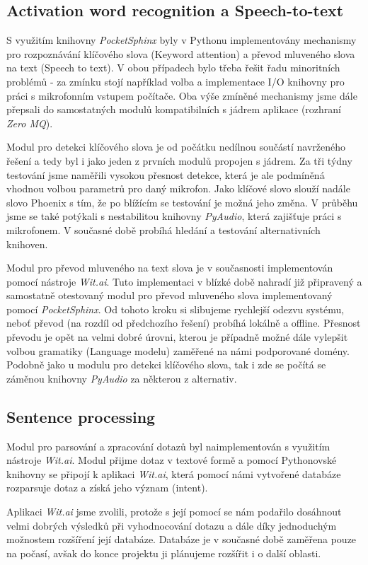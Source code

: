 \documentclass[12pt,a4paper]{article}
\begin{document}
\subsection*{Activation word recognition a Speech-to-text}
S využitím knihovny \textit{PocketSphinx} byly v Pythonu implementovány mechanismy pro rozpoznávání klíčového slova (Keyword attention) a převod mluveného slova na text (Speech to text). V obou případech bylo třeba řešit řadu minoritních problémů - za zmínku stojí například volba a implementace I/O knihovny pro práci s mikrofonním vstupem počítače. Oba výše zmíněné mechanismy jsme dále přepsali do samostatných modulů kompatibilních s jádrem aplikace (rozhraní \textit{Zero MQ}).

Modul pro detekci klíčového slova je od počátku nedílnou součástí navrženého řešení a tedy byl i jako jeden z prvních modulů propojen s jádrem. Za tři týdny testování jsme naměřili vysokou přesnost detekce, která je ale podmíněná vhodnou volbou parametrů pro daný mikrofon. Jako klíčové slovo slouží nadále slovo Phoenix s tím, že po blížícím se testování je možná jeho změna. V průběhu jsme se také potýkali s nestabilitou knihovny \textit{PyAudio}, která zajišťuje práci s mikrofonem. V současné době probíhá hledání a testování alternativních knihoven.


Modul pro převod mluveného na text slova je v současnosti implementován pomocí nástroje \textit{Wit.ai}. Tuto implementaci v blízké době nahradí již připravený a samostatně otestovaný modul pro převod mluveného slova implementovaný pomocí \textit{PocketSphinx}. Od tohoto kroku si slibujeme rychlejší odezvu systému, neboť převod (na rozdíl od předchozího řešení) probíhá lokálně a offline. Přesnost převodu je opět na velmi dobré úrovni, kterou je případně možné dále vylepšit volbou gramatiky (Language modelu) zaměřené na námi podporované domény. Podobně jako u modulu pro detekci klíčového slova, tak i zde se počítá se záměnou knihovny \textit{PyAudio} za některou z alternativ.
\subsection*{Sentence processing}
Modul pro parsování a zpracování dotazů byl naimplementován s využitím nástroje \textit{Wit.ai}. Modul přijme dotaz v textové formě a pomocí Pythonovské knihovny se připojí k aplikaci \textit{Wit.ai}, která pomocí námi vytvořené databáze rozparsuje dotaz a získá jeho význam (intent). 

Aplikaci \textit{Wit.ai} jsme zvolili, protože s její pomocí se nám podařilo dosáhnout velmi dobrých výsledků při vyhodnocování dotazu a dále díky jednoduchým možnostem rozšíření její databáze. Databáze je v současné době zaměřena pouze na počasí, avšak do konce projektu ji plánujeme rozšířit i o další oblasti.
\end{document}
